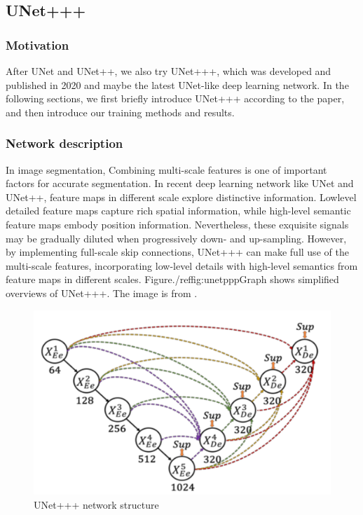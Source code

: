 \subsection{UNet+++}
\subsubsection{Motivation}
After UNet and UNet++, we also try UNet+++\cite{unet_ppp},
which was developed and published in 2020 and maybe the latest UNet-like deep learning network.
In the following sections, we first briefly introduce UNet+++ according to the paper, and then introduce our training methods and results.

\subsubsection{Network description}
In image segmentation, Combining multi-scale features is one of important factors for accurate segmentation.
In recent deep learning network like UNet and UNet++, feature maps in different scale explore distinctive information. Lowlevel detailed feature maps capture rich spatial information, 
while high-level semantic feature maps embody position information. 
Nevertheless, these exquisite signals may be gradually diluted when progressively down- and up-sampling.
However, by implementing full-scale skip connections, UNet+++ can make full use of the multi-scale features, incorporating low-level details with high-level semantics from feature maps in different scales. 
Figure./ref{fig:unetpppGraph} shows simplified overviews of UNet+++. The image is from \cite{unet_ppp}.

\begin{figure}[!htpb]
\includegraphics[width=\linewidth]{figuras/unet3+.png}
\caption{UNet+++ network structure}
\label{fig:unetpppGraph}
\end{figure}